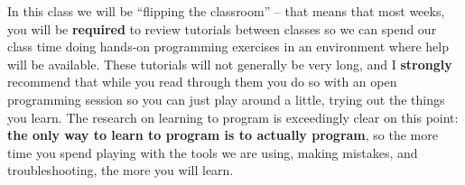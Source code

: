 \documentclass[12pt]{article}
\begin{document}
In this class we will be ``flipping the classroom'' -- that means that most weeks, you will be \textbf{required} to review tutorials between classes so we can spend our class time doing hands-on programming exercises in an environment where help will be available. These tutorials will not generally be very long, and I \textbf{strongly} recommend that while you read through them you do so with an open programming session so you can just play around a little, trying out the things you learn. The research on learning to program is exceedingly clear on this point: \textbf{the only way to learn to program is to actually program}, so the more time you spend playing with the tools we are using, making mistakes, and troubleshooting, the more you will learn.


\end{document}
